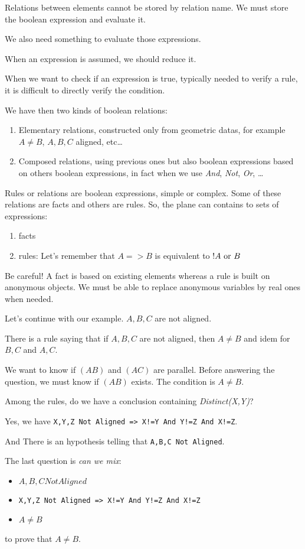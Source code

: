 \documentclass[a4paper]{article}
\begin{document}
Relations between elements cannot be stored by relation name. We must store the boolean expression and evaluate it.

We also need something to evaluate those expressions.

When an expression is assumed, we should reduce it.

When we want to check if an expression is true, typically needed to verify a rule, it is difficult to directly verify the condition.

We have then two kinds of boolean relations:
\begin{enumerate}
\item Elementary relations, constructed only from geometric datas, for example $A\neq B$, $A, B, C$ aligned, etc\dots
\item Composed relations, using previous ones but also boolean expressions based on others boolean expressions, in fact when we use \textit{And}, \textit{Not}, \textit{Or}, \dots
\end{enumerate}

Rules or relations are boolean expressions, simple or complex. Some of these relations are facts and others are rules. So, the plane can contains to sets of expressions:
\begin{enumerate}
\item facts
\item rules: Let's remember that $A => B$ is equivalent to $!A \hbox{ or } B$
\end{enumerate}

Be careful! A fact is based on existing elements whereas a rule is built on anonymous objects. We must be able to replace anonymous variables by real ones when needed.

Let's continue with our example. $A,B,C$ are not aligned.

There is a rule saying that if $A,B,C$ are not aligned, then $A\neq B$ and idem for $B,C$ and $A,C$.

We want to know if $(AB)$ and $(AC)$ are parallel. Before answering the question, we must know if $(AB)$ exists. The condition is $A\neq B$.

Among the rules, do we have a conclusion containing \textit{Distinct(X,Y)}?

Yes, we have \texttt{X,Y,Z Not Aligned => X!=Y And Y!=Z And X!=Z}.

And There is an hypothesis telling that \texttt{A,B,C Not Aligned}.

The last question is \textit{can we mix}:
\begin{itemize}
\item $A,B,C Not Aligned$
\item \texttt{X,Y,Z Not Aligned => X!=Y And Y!=Z And X!=Z}
\item $A\neq B$
\end{itemize}
to prove that $A\neq B$.
\end{document}
